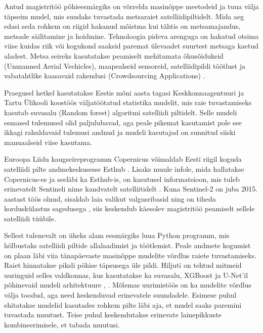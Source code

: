 Antud magistritöö põhieesmärgiks on võrrelda masinõppe meetodeid ja tuua välja täpseim mudel, mis suudaks tuvastada metsaraiet satelliidipiltidelt. Mida aeg edasi seda rohkem on riigid hakanud mõistma kui tähtis on metsamajandus, metsade säilitamine ja hoidmine. Tehnoloogia pideva arenguga on hakatud otsima viise kuidas riik või kogukond saaksid paremat ülevaadet suurtest metsaga kaetud aladest. Metsa seireks kasutatakse peamiselt mehitamata õhusõidukeid (Unmanned Aerial Vechicles), maapealseid sensoreid, satelliidipildi töötlust ja vabatahtlike kaasavaid rakendusi (Crowdsourcing Applications) \cite{cheungPerimeterDefense42015}.

Praegusel hetkel kasutatakse Eestis mõni aasta tagasi Keskkonnaagentuuri ja Tartu Ülikooli koostöös väljatöötatud statistika mudelit, mis raie tuvastamiseks kasutab suvasalu (Random forest) algoritmi \cite{TartuUlikooliTeadlased2020} satelliidi piltidelt. Selle mudeli esmased tulemused olid paljulubavad, aga peale pikemat kasutamist pole see ikkagi rahuldavaid tulemusi andnud ja mudeli kasutajad on sunnitud siiski manuaalseid viise kasutama.

Euroopa Liidu kaugseireprogramm Copernicus võimaldab Eesti riigil koguda satelliidi pilte andmekeskusesse Esthub \cite{maa-ametRiiklikSatelliidiandmeteKeskus}. Lisaks muule infole, mida hallatakse Copernicus-es ja seeläbi ka Esthub-is, on kasutusel informatsioon, mis tuleb erinevatelt Sentineli nime kandvatelt satelliitidelt \cite{InfrastructureOverviewCopernicus}. Kuna Sentinel-2 on juba 2015. aastast töös olnud, sisaldab laia valikut valgusribasid ning on tiheda korduskülastus sagedusega \cite{Sentinel2OverviewScienceDirect}, siis keskendub käesolev magistritöö peamiselt sellele satelliidi tüübile.

Sellest tulenevalt on üheks alam eesmärgiks luua Python programm, mis hõlbustaks satelliidi piltide allalaadimist ja töötlemist. Peale andmete kogumist on plaan läbi viia tänapäevaste masinõppe mudelite võrdlus raiete tuvastamiseks. Raiet hinnatakse piksli põhise täpsusega üle pildi. Hiljuti on tehtud mitmeid uuringuid selles valdkonnas, kus kasutatakse ka suvasalu, XGBoost ja U-Net’il põhinevaid mudeli arhitektuure \cite{isaienkovDeepLearningRegular2021}, \cite{podoprigorovaRecognitionForestDamage2024}. Mõlemas uurimistöös on ka mudelite võrdlus välja toodud, aga need keskenduvad erinevatele suundadele. Esimese puhul ehitatakse mudelid kasutades rohkem pilte läbi aja, et mudel saaks paremini tuvastada muutust. Teise puhul keskendutakse erinevate lainepikkuste kombineerimisele, et tabada muutusi. 

